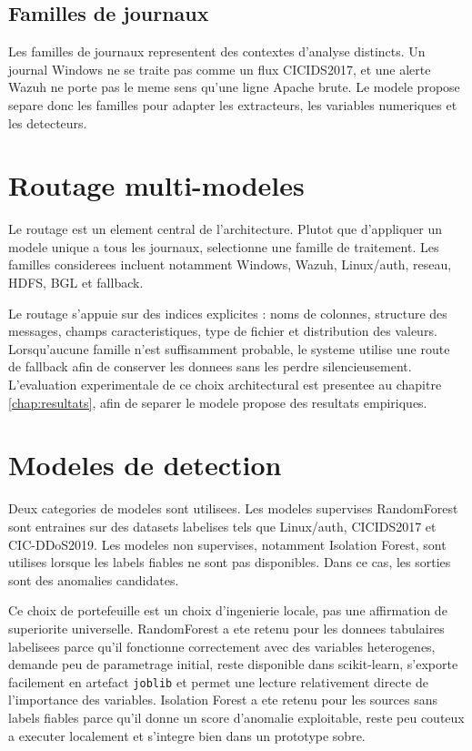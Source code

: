 \subsection{Familles de journaux}
Les familles de journaux representent des contextes d'analyse distincts. Un journal Windows ne se traite pas comme un flux CICIDS2017, et une alerte Wazuh ne porte pas le meme sens qu'une ligne Apache brute. Le modele propose separe donc les familles pour adapter les extracteurs, les variables numeriques et les detecteurs.

\section{Routage multi-modeles}
Le routage est un element central de l'architecture. Plutot que d'appliquer un modele unique a tous les journaux, \logminer{} selectionne une famille de traitement. Les familles considerees incluent notamment Windows, Wazuh, Linux/auth, reseau, HDFS, BGL et fallback.

Le routage s'appuie sur des indices explicites : noms de colonnes, structure des messages, champs caracteristiques, type de fichier et distribution des valeurs. Lorsqu'aucune famille n'est suffisamment probable, le systeme utilise une route de fallback afin de conserver les donnees sans les perdre silencieusement.
L'evaluation experimentale de ce choix architectural est presentee au chapitre \ref{chap:resultats}, afin de separer le modele propose des resultats empiriques.

\section{Modeles de detection}
Deux categories de modeles sont utilisees. Les modeles supervises RandomForest sont entraines sur des datasets labelises tels que Linux/auth, CICIDS2017 et CIC-DDoS2019. Les modeles non supervises, notamment Isolation Forest, sont utilises lorsque les labels fiables ne sont pas disponibles. Dans ce cas, les sorties sont des anomalies candidates.

Ce choix de portefeuille est un choix d'ingenierie locale, pas une affirmation de superiorite universelle. RandomForest a ete retenu pour les donnees tabulaires labelisees parce qu'il fonctionne correctement avec des variables heterogenes, demande peu de parametrage initial, reste disponible dans scikit-learn, s'exporte facilement en artefact \texttt{joblib} et permet une lecture relativement directe de l'importance des variables. Isolation Forest a ete retenu pour les sources sans labels fiables parce qu'il donne un score d'anomalie exploitable, reste peu couteux a executer localement et s'integre bien dans un prototype sobre.


